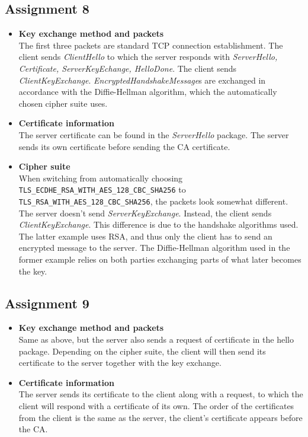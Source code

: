\documentclass[11pt,a4paper]{article}
\begin{document}
\subsection{Assignment 8} 
\begin{itemize}
\item \textbf{Key exchange method and packets}\\The first three packets are standard TCP connection establishment. The client sends \textit{ClientHello} to which the server responds with \textit{ServerHello, Certificate, ServerKeyEchange, HelloDone}. The client sends \textit{ClientKeyExchange}. \textit{EncryptedHandshakeMessage}s are exchanged in accordance with the Diffie-Hellman algorithm, which the automatically chosen cipher suite uses.
\item \textbf{Certificate information}\\
The server certificate can be found in the \textit{ServerHello} package. The server sends its own certificate before sending the CA certificate.
\item \textbf{Cipher suite}\\
When switching from automatically choosing \texttt{TLS\_ECDHE\_RSA\_WITH\_AES\_128\_CBC\_SHA256} to
\texttt{TLS\_RSA\_WITH\_AES\_128\_CBC\_SHA256}, the packets look somewhat different. The server doesn't send \textit{ServerKeyExchange}. Instead, the client sends \textit{ClientKeyExchange}. This difference is due to the handshake algorithms used. The latter example uses RSA, and thus only the client has to send an encrypted message to the server. The Diffie-Hellman algorithm used in the former example relies on both parties exchanging parts of what later becomes the key.
\end{itemize}

\subsection{Assignment 9}
\begin{itemize}
\item \textbf{Key exchange method and packets}\\ 
Same as above, but the server also sends a request of certificate in the hello package. Depending on the cipher suite, the client will then send its certificate to the server together with the key exchange.
\item \textbf{Certificate information}\\
The server sends its certificate to the client along with a request, to which the client will respond with a certificate of its own.
The order of the certificates from the client is the same as the server, the client's certificate appears before the CA.  
\end{itemize}
\end{document}
